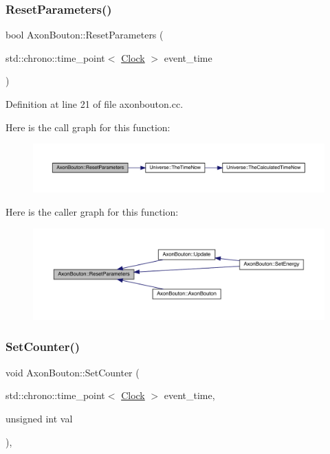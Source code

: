 \subsubsection{\texorpdfstring{Reset\+Parameters()}{ResetParameters()}}
{\footnotesize\ttfamily bool Axon\+Bouton\+::\+Reset\+Parameters (\begin{DoxyParamCaption}\item[{std\+::chrono\+::time\+\_\+point$<$ \hyperlink{universe_8h_a0ef8d951d1ca5ab3cfaf7ab4c7a6fd80}{Clock} $>$}]{event\+\_\+time }\end{DoxyParamCaption})}



Definition at line 21 of file axonbouton.\+cc.

Here is the call graph for this function\+:
\nopagebreak
\begin{figure}[H]
\begin{center}
\leavevmode
\includegraphics[width=350pt]{class_axon_bouton_a73d3721361c4e1ce6b110ffe1b4a7a88_cgraph}
\end{center}
\end{figure}
Here is the caller graph for this function\+:
\nopagebreak
\begin{figure}[H]
\begin{center}
\leavevmode
\includegraphics[width=350pt]{class_axon_bouton_a73d3721361c4e1ce6b110ffe1b4a7a88_icgraph}
\end{center}
\end{figure}
\mbox{\label{class_axon_bouton_afe285478d414f2815afb98abe7b92898}} 
\subsubsection{\texorpdfstring{Set\+Counter()}{SetCounter()}}
{\footnotesize\ttfamily void Axon\+Bouton\+::\+Set\+Counter (\begin{DoxyParamCaption}\item[{std\+::chrono\+::time\+\_\+point$<$ \hyperlink{universe_8h_a0ef8d951d1ca5ab3cfaf7ab4c7a6fd80}{Clock} $>$}]{event\+\_\+time,  }\item[{unsigned int}]{val }\end{DoxyParamCaption})\hspace{0.3cm}{\ttfamily [inline]}, {\ttfamily [virtual]}}



